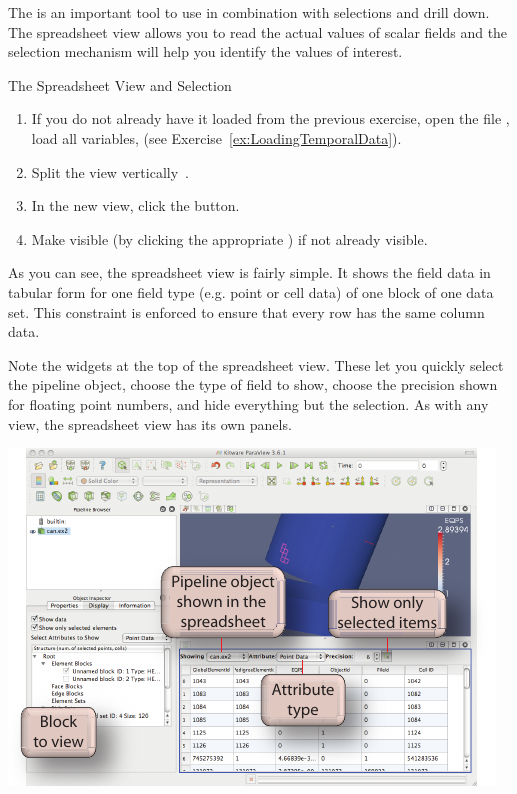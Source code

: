 The  is an important tool to use in combination
with selections and drill down.  The spreadsheet view allows you to read
the actual values of scalar fields and the selection mechanism will help
you identify the values of interest.

\begin{exercise}{The Spreadsheet View and Selection}
  \label{ex:TheSpreadsheetViewAndSelection}%
  \begin{enumerate}
  \item If you do not already have it loaded from the previous exercise,
    open the file , load all variables, \apply (see
    Exercise~\ref{ex:LoadingTemporalData}).
  \item Split the view vertically~\splitViewV.
  \item In the new view, click the  button.
  \item Make  visible (by clicking the appropriate \eyeballg)
    if not already visible.
    \savecounter
  \end{enumerate}

  As you can see, the spreadsheet view is fairly simple.  It shows the
  field data in tabular form for one field type (e.g. point or cell data)
  of one block of one data set.  This constraint is enforced to ensure that
  every row has the same column data.

  Note the widgets at the top of the spreadsheet view.  These let you
  quickly select the pipeline object, choose the type of field to show,
  choose the precision shown for floating point numbers, and hide
  everything but the selection.  As with any view, the spreadsheet view has
  its own  panels.

  \begin{inlinefig}
    \includegraphics{images/SpreadsheetViewLabeled}
  \end{inlinefig}


\end{exercise}
